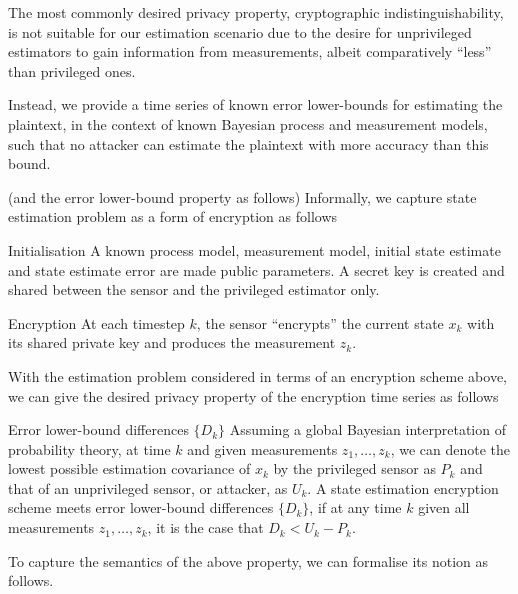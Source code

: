\documentclass[conference]{IEEEtran}
\theoremstyle{definition}
\theoremstyle{definition}
\theoremstyle{remark}
\begin{document}
The most commonly desired privacy property, cryptographic indistinguishability, is not suitable for our estimation scenario due to the desire for unprivileged estimators to gain information from measurements, albeit comparatively ``less'' than privileged ones.

Instead, we provide a time series of known error lower-bounds for estimating the plaintext, in the context of known Bayesian process and measurement models, such that no attacker can estimate the plaintext with more accuracy than this bound. 

(and the error lower-bound property as follows)
Informally, we capture state estimation problem as a form of encryption as follows

\begin{LaTeXdescription}
   \item[Initialisation] A known process model, measurement model, initial state estimate and state estimate error are made public parameters. A secret key is created and shared between the sensor and the privileged estimator only.
   \item[Encryption] At each timestep $k$, the sensor ``encrypts'' the current state $x_k$ with its shared private key and produces the measurement $z_k$.
\end{LaTeXdescription}


With the estimation problem considered in terms of an encryption scheme above, we can give the desired privacy property of the encryption time series as follows

\begin{LaTeXdescription}
   \item[Error lower-bound differences $\{D_k\}$] Assuming a global Bayesian interpretation of probability theory, at time $k$ and given measurements $z_1,\dots,z_k$, we can denote the lowest possible estimation covariance of $x_k$ by the privileged sensor as $P_k$ and that of an unprivileged sensor, or attacker, as $U_k$. A state estimation encryption scheme meets error lower-bound differences $\{D_k\}$, if at any time $k$ given all measurements $z_1,\dots,z_k$, it is the case that $D_k<U_k-P_k$.
\end{LaTeXdescription}

To capture the semantics of the above property, we can formalise its notion as follows.
\end{document}
